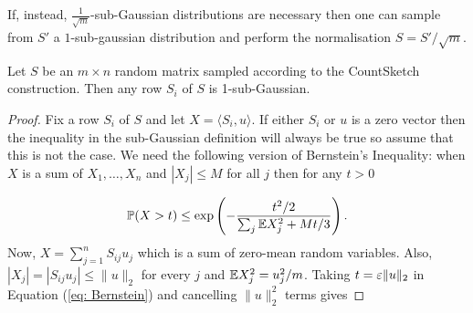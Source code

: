 \begin{rem}
  If, instead, $\frac{1}{\sqrt{m}}$-sub-Gaussian distributions are necessary
  then one can sample from $S'$ a $1$-sub-gaussian distribution and perform the
  normalisation $S = S'/\sqrt{m}$.
\end{rem}

\begin{Lemma}
  Let $S$ be an $m \times n$ random matrix sampled according to the CountSketch
  construction.
  Then any row $S_i$ of $S$ is 1-sub-Gaussian.
\end{Lemma}

\begin{proof}
  Fix a row $S_i$ of $S$ and let $X = \langle S_i, u \rangle$.
  If either $S_i$ or $u$ is a zero vector then the
  inequality in the sub-Gaussian definition will always be true so assume that
  this is not the case.
  We need the following version of Bernstein's Inequality:
  when $X$ is a sum of $X_1,\ldots,X_n$ and $|X_j| \le M$ for all $j$ then for
  any $t > 0$

  \begin{equation} \label{eq: Bernstein}
    \mathbb{P} (X > t) \le \exp \left( - \frac{t^2 / 2}{\sum_j \mathbb{E} X_j^2 + Mt/3
    } \right).
  \end{equation}
  Now, $X = \sum_{j=1}^n S_{ij} u_j$ which is a sum of zero-mean random variables.
  Also, $|X_j| = |S_{ij} u_j| \le \| u \|_2$ for every $j$ and $\mathbb{E} X_j^2 =
  u_j^2/m$.
  Taking $t = \varepsilon \| u \|_2$ in Equation (\ref{eq: Bernstein}) and cancelling
  $\| u \|_2^2$ terms gives


\end{proof}
